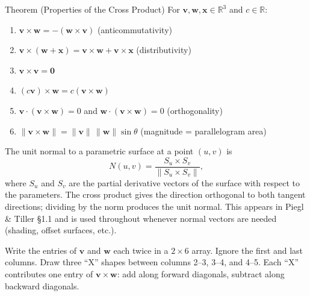 \begin{theorembox}{Theorem (Properties of the Cross Product)}
For $\mathbf{v}, \mathbf{w}, \mathbf{x} \in \mathbb{R}^3$ and $c \in \mathbb{R}$:
\begin{enumerate}
  \item $\mathbf{v} \times \mathbf{w} = -(\mathbf{w} \times \mathbf{v})$ \hfill (anticommutativity)
  \item $\mathbf{v} \times (\mathbf{w} + \mathbf{x}) = \mathbf{v} \times \mathbf{w} + \mathbf{v} \times \mathbf{x}$ \hfill (distributivity)
  \item $\mathbf{v} \times \mathbf{v} = \mathbf{0}$
  \item $(c\mathbf{v}) \times \mathbf{w} = c(\mathbf{v} \times \mathbf{w})$
  \item $\mathbf{v} \cdot (\mathbf{v} \times \mathbf{w}) = 0$ and $\mathbf{w} \cdot (\mathbf{v} \times \mathbf{w}) = 0$ \hfill (orthogonality)
  \item $\|\mathbf{v} \times \mathbf{w}\| = \|\mathbf{v}\|\,\|\mathbf{w}\|\sin\theta$ \hfill (magnitude = parallelogram area)
\end{enumerate}
\end{theorembox}

\begin{remark*}
The unit normal to a parametric surface at a point $(u,v)$ is
\[
  N(u,v) = \frac{S_u \times S_v}{\|S_u \times S_v\|},
\]
where $S_u$ and $S_v$ are the partial derivative vectors of the surface
with respect to the parameters.
The cross product gives the direction orthogonal to both tangent directions;
dividing by the norm produces the unit normal.
This appears in Piegl \& Tiller \S{}1.1 and is used throughout whenever
normal vectors are needed (shading, offset surfaces, etc.).
\end{remark*}

\begin{remark*}
Write the entries of $\mathbf{v}$ and $\mathbf{w}$ each twice in a $2 \times 6$ array.
Ignore the first and last columns.
Draw three ``X'' shapes between columns 2--3, 3--4, and 4--5.
Each ``X'' contributes one entry of $\mathbf{v} \times \mathbf{w}$: add along forward
diagonals, subtract along backward diagonals.
\end{remark*}

